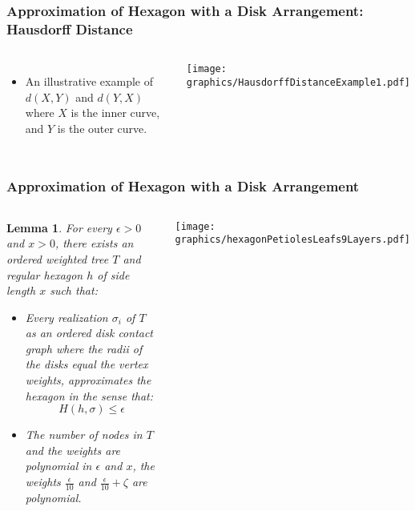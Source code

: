 \documentclass{beamer}
\newtheorem{lem}{Lemma}
\newcommand{\lr}[1]{\left( #1 \right)}
\begin{document}
\begin{frame} \frametitle{Approximation of Hexagon with a Disk Arrangement: Hausdorff Distance}
    \begin{columns}[c]
            \begin{itemize}
            \item[*] An illustrative example of $d(X,Y)$ and $d(Y,X)$ where $X$ is the inner curve, and $Y$ is the outer curve.
            \end{itemize}  
        \begin{minipage}{\linewidth}
        \begin{center}
        \texttt{[image: graphics/HausdorffDistanceExample1.pdf]}
        \end{center}
        \end{minipage}
    \end{columns}
\end{frame}

\begin{frame} \frametitle{Approximation of Hexagon with a Disk Arrangement}
    \begin{columns}[c]
        \begin{lem}
            For every $\epsilon > 0$ and $x>0$, there exists an ordered weighted tree $T$ and regular hexagon $h$ of side length $x$ such that:
            \begin{itemize}
            \item[*] Every realization $\sigma_i$ of $T$ as an ordered disk contact graph where the radii of the disks equal the vertex weights, approximates the hexagon in the sense that:
            $$H\lr{h,\sigma}\leq\epsilon$$
            \item[*] The number of nodes in $T$ and the weights are polynomial in $\epsilon$ and $x$, the weights $\frac{\epsilon}{10}$ and $\frac{\epsilon}{10} + \zeta$ are polynomial.
            \end{itemize}
        \end{lem}   
        \begin{minipage}{\linewidth}
            \begin{center}
            \texttt{[image: graphics/hexagonPetiolesLeafs9Layers.pdf]}
            \end{center}
        \end{minipage}
    \end{columns}
\end{frame}
\end{document}

